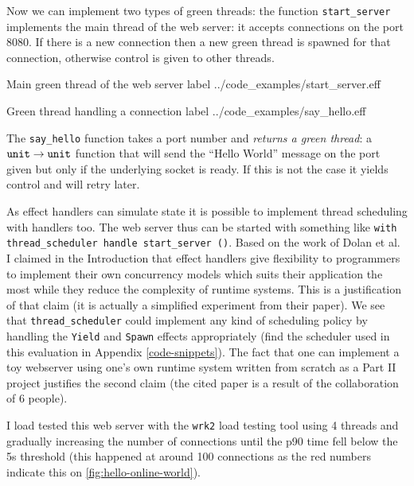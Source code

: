 \documentclass[class=article, crop=false]{standalone}
\begin{document}
Now we can implement two types of green threads: the function
\lstinline|start_server| implements the main thread of the web server: it
accepts connections on the port 8080. If there is a new connection then a new
green thread is spawned for that connection, otherwise control is given to other
threads.

{Main green thread of the web server}
{label}
{../code_examples/start_server.eff}

{Green thread handling a connection}
{label}
{../code_examples/say_hello.eff}

The \lstinline{say_hello} function takes a port number and
\emph{returns a green thread}: a $\mathtt{unit} \to \mathtt{unit}$ function that will
send the ``Hello World'' message on the port given but only if the underlying
socket is ready. If this is not the case it yields control and will retry later.


As effect handlers can simulate state it is possible to implement thread
scheduling with handlers too. The web server thus can be started with something
like \lstinline{with thread_scheduler handle start_server ()}.
%
Based on the work of Dolan et al.\ \cite{dolan2017concurrent} I claimed in
the Introduction that effect handlers give flexibility to programmers to
implement their own concurrency models which suits their application the most
while they reduce the complexity of runtime systems. This is a justification of
that claim (it is actually a simplified experiment from their paper). We see
that \lstinline|thread_scheduler| could implement any kind of scheduling policy by
handling the \lstinline|Yield| and \lstinline|Spawn| effects appropriately (find
the scheduler used in this evaluation in Appendix \ref{code-snippets}). The fact that
one can implement a toy webserver using one's own runtime system written from
scratch as a Part II project justifies the second claim (the cited paper is a
result of the collaboration of 6 people).

I load tested this web server with the \lstinline|wrk2| load testing tool
\cite{wrk2-website} using 4 threads and gradually increasing the number of
connections until the p90 time fell below the 5s threshold (this happened at
around 100 connections as the red numbers indicate this on
\autoref{fig:hello-online-world}).
\end{document}
